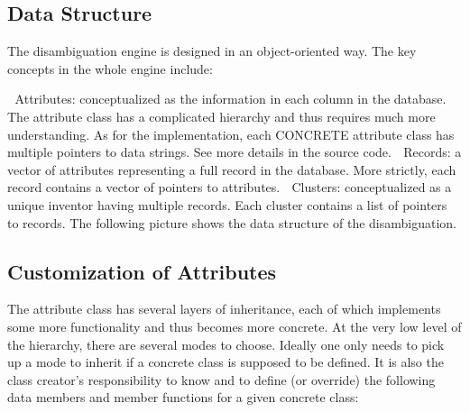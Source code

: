 \documentclass{article}
\begin{document}
\subsection{Data Structure}


The disambiguation engine is designed in an object-oriented 
way. The key concepts in the whole engine include:


 Attributes: conceptualized as the information in each column in the database. The attribute
class has a complicated hierarchy and thus requires much more understanding. As for the
implementation, each CONCRETE attribute class has multiple pointers to data strings. See
more details in the source code.
 Records: a vector of attributes representing a full record in the database. More strictly, each
record contains a vector of pointers to attributes.
 Clusters: conceptualized as a unique inventor having multiple records. Each cluster contains a
list of pointers to records.
The following picture shows the data structure of the disambiguation.


\subsection{Customization of Attributes}


The attribute class has several layers of inheritance, 
each of which implements some more functionality and thus 
becomes more concrete. At the  very low level of the 
hierarchy, there are several modes to choose. Ideally one 
only needs to pick up a mode to inherit if a concrete class 
is supposed to be defined. It is also the class creator’s 
responsibility to know and to define (or override) the 
following data members and member functions for a 
given concrete class:
\end{document}
